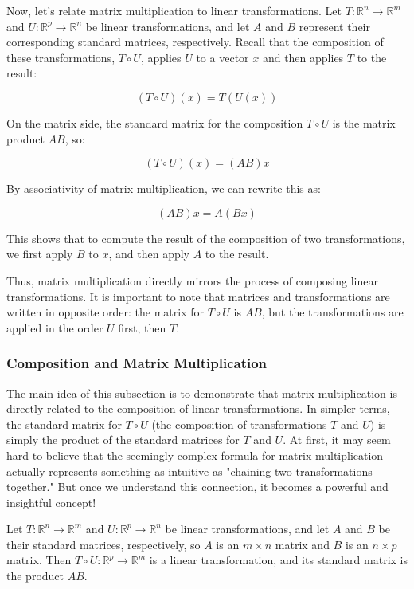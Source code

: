 \documentclass[a4paper,12pt]{article}
\begin{document}
Now, let’s relate matrix multiplication to linear transformations. Let \( T: \mathbb{R}^n \to \mathbb{R}^m \) and \( U: \mathbb{R}^p \to \mathbb{R}^n \) be linear transformations, and let \( A \) and \( B \) represent their corresponding standard matrices, respectively. Recall that the composition of these transformations, \( T \circ U \), applies \( U \) to a vector \( x \) and then applies \( T \) to the result:

\[
(T \circ U)(x) = T(U(x))
\]

On the matrix side, the standard matrix for the composition \( T \circ U \) is the matrix product \( AB \), so:

\[
(T \circ U)(x) = (AB)x
\]

By associativity of matrix multiplication, we can rewrite this as:

\[
(AB)x = A(Bx)
\]

This shows that to compute the result of the composition of two transformations, we first apply \( B \) to \( x \), and then apply \( A \) to the result.

Thus, matrix multiplication directly mirrors the process of composing linear transformations. It is important to note that matrices and transformations are written in opposite order: the matrix for \( T \circ U \) is \( AB \), but the transformations are applied in the order \( U \) first, then \( T \).

\subsubsection{Composition and Matrix Multiplication}The main idea of this subsection is to demonstrate that matrix multiplication is directly related to the composition of linear transformations. In simpler terms, the standard matrix for \( T \circ U \) (the composition of transformations \( T \) and \( U \)) is simply the product of the standard matrices for \( T \) and \( U \). At first, it may seem hard to believe that the seemingly complex formula for matrix multiplication actually represents something as intuitive as "chaining two transformations together." But once we understand this connection, it becomes a powerful and insightful concept!

\begin{tcolorbox}[title=Theorem,colframe=blue!70!black, colback=blue!5!white]
Let \( T: \mathbb{R}^n \to \mathbb{R}^m \) and \( U: \mathbb{R}^p \to \mathbb{R}^n \) be linear transformations, and let \( A \) and \( B \) be their standard matrices, respectively, so \( A \) is an \( m \times n \) matrix and \( B \) is an \( n \times p \) matrix. Then \( T \circ U: \mathbb{R}^p \to \mathbb{R}^m \) is a linear transformation, and its standard matrix is the product \( AB \).
\end{tcolorbox}
\end{document}
